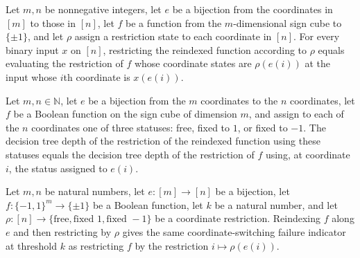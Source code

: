 \begin{theorem}
\label{FABL.CoordRestriction.restrict_reindexBooleanFunction}
\leanok
{}
Let $m,n$ be nonnegative integers, let $e$ be a bijection from the coordinates in $[m]$
to those in $[n]$, let $f$ be a function from the $m$-dimensional sign cube to
$\{\pm1\}$, and let $\rho$ assign a restriction state to each coordinate in $[n]$. For
every binary input $x$ on $[n]$, restricting the reindexed function according to $\rho$
equals evaluating the restriction of $f$ whose coordinate states are $\rho(e(i))$ at the
input whose $i$th coordinate is $x(e(i))$.
\end{theorem}

\begin{theorem}
\label{FABL.restrictedDecisionTreeDepth_reindexBooleanFunction}
\leanok
{}
Let $m,n\in\mathbb N$, let $e$ be a bijection from the $m$ coordinates to the $n$
coordinates, let $f$ be a Boolean function on the sign cube of dimension $m$, and assign
to each of the $n$ coordinates one of three statuses: free, fixed to $1$, or fixed to
$-1$. The decision tree depth of the restriction of the reindexed function using these
statuses equals the decision tree depth of the restriction of $f$ using, at coordinate
$i$, the status assigned to $e(i)$.
\end{theorem}

\begin{theorem}
\label{FABL.coordSwitchingFailureIndicator_reindexBooleanFunction}
\leanok
{}
Let $m,n$ be natural numbers, let $e:[m]\to[n]$ be a bijection, let
$f:\{-1,1\}^m\to\{\pm1\}$ be a Boolean function, let $k$ be a natural number, and
let $\rho:[n]\to\{\text{free},\text{fixed }1,\text{fixed }-1\}$ be a coordinate
restriction. Reindexing $f$ along $e$ and then restricting by $\rho$ gives the same
coordinate-switching failure indicator at threshold $k$ as restricting $f$ by the
restriction $i\mapsto\rho(e(i))$.
\end{theorem}

